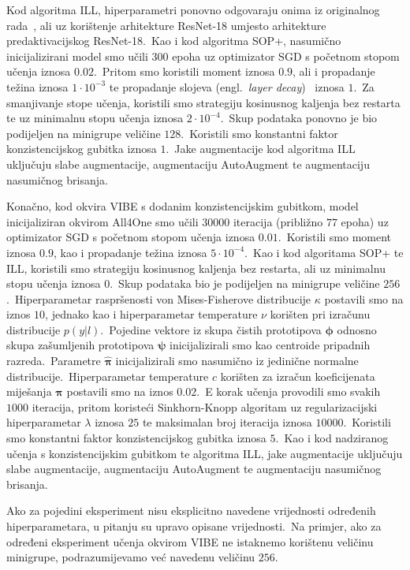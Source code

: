 \documentclass[diplomskirad]{fer}
\begin{document}
Kod algoritma ILL, hiperparametri ponovno odgovaraju onima iz originalnog rada~\cite{chen2024imprecise}, ali uz korištenje arhitekture ResNet-18 umjesto arhitekture predaktivacijskog ResNet-18.\ 
Kao i kod algoritma SOP+, nasumično inicijalizirani model smo učili 300 epoha uz optimizator SGD s početnom stopom učenja iznosa $0.02$.\ 
Pritom smo koristili moment iznosa $0.9$, ali i propadanje težina iznosa $1 \cdot 10^{-3}$ te propadanje slojeva (engl.\ \textit{layer decay})~\cite{ishii2017layer} iznosa $1$.\ 
Za smanjivanje stope učenja, koristili smo strategiju kosinusnog kaljenja bez restarta te uz minimalnu stopu učenja iznosa $2 \cdot 10^{-4}$.\
Skup podataka ponovno je bio podijeljen na minigrupe veličine $128$.\ Koristili smo konstantni faktor konzistencijskog gubitka iznosa $1$.\
Jake augmentacije kod algoritma ILL uključuju slabe augmentacije, augmentaciju AutoAugment te augmentaciju nasumičnog brisanja.\

Konačno, kod okvira VIBE s dodanim konzistencijskim gubitkom, model inicijaliziran okvirom All4One smo učili $30 000$ iteracija (približno $77$ epoha) uz optimizator SGD s početnom stopom učenja iznosa $0.01$.\ 
Koristili smo moment iznosa $0.9$, kao i propadanje težina iznosa $5 \cdot 10^{-4}$.\ Kao i kod algoritama SOP+ te ILL, koristili smo strategiju kosinusnog kaljenja bez restarta, ali uz minimalnu stopu učenja iznosa $0$.\ 
Skup podataka bio je podijeljen na minigrupe veličine $256$.\ Hiperparametar raspršenosti von Mises-Fisherove distribucije $\kappa$ postavili smo na iznos $10$, jednako kao i hiperparametar temperature $\nu$ korišten pri izračunu distribucije $p(y | l)$.\ 
Pojedine vektore iz skupa čistih prototipova $\bm{\phi}$ odnosno skupa zašumljenih prototipova $\bm{\psi}$ inicijalizirali smo kao centroide pripadnih razreda.\ Parametre $\bm{\hat{\pi}}$ inicijalizirali smo nasumično iz jedinične normalne distribucije.\ 
Hiperparametar temperature $c$ korišten za izračun koeficijenata miješanja $\bm{\pi}$ postavili smo na iznos $0.02$.\ E korak učenja provodili smo svakih $1000$ iteracija, pritom koristeći Sinkhorn-Knopp algoritam uz regularizacijski hiperparametar $\lambda$ iznosa $25$ te maksimalan broj iteracija iznosa $10 000$.\ 
Koristili smo konstantni faktor konzistencijskog gubitka iznosa $5$.\ Kao i kod nadziranog učenja s konzistencijskim gubitkom te algoritma ILL, jake augmentacije uključuju slabe augmentacije, augmentaciju AutoAugment te augmentaciju nasumičnog brisanja.\ 

Ako za pojedini eksperiment nisu eksplicitno navedene vrijednosti određenih hiperparametara, u pitanju su upravo opisane vrijednosti.\ 
Na primjer, ako za određeni eksperiment učenja okvirom VIBE ne istaknemo korištenu veličinu minigrupe, podrazumijevamo već navedenu veličinu $256$.\
\end{document}

